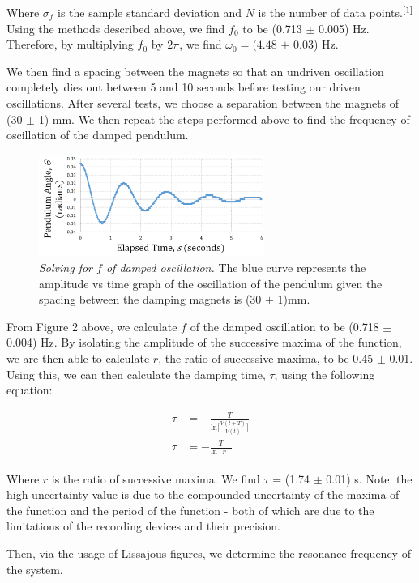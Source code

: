 \documentclass[twoside,twocolumn]{article}
\begin{document}
\noindent Where $\sigma_f$ is the sample standard deviation and $N$ is the number of data points.$\textsuperscript{[1]}$ Using the methods described above, we find $f_0$ to be (0.713 $\pm$ 0.005) Hz. Therefore, by multiplying $f_0$ by $2\pi$, we find $\omega_0 = (4.48$ $\pm$ 0.03) Hz. 


\noindent We then find a spacing between the magnets so that an undriven oscillation completely dies out between 5 and 10 seconds before testing our driven oscillations. After several tests, we choose a separation between the magnets of (30 $\pm$ 1) mm. We then repeat the steps performed above to find the frequency of oscillation of the damped pendulum.

\begin{figure}[!htbp]
    \centering
    \includegraphics[width=2.9in]{DampedFreq.png}
    \caption{\textit{Solving for $f$ of damped oscillation.} The blue curve represents the amplitude vs time graph of the oscillation of the pendulum given the spacing between the damping magnets is (30 $\pm$ 1)mm.}
\end{figure}

\noindent From Figure 2 above, we calculate $f$ of the damped oscillation to be (0.718 $\pm$ 0.004) Hz. By isolating the amplitude of the successive maxima of the function, we are then able to calculate $r$, the ratio of successive maxima, to be 0.45 $\pm$ 0.01. Using this, we can then calculate the damping time, $\tau$, using the following equation:

\footnotesize
\begin{align}
\tau &= -\frac{T}{\text{ln}\Big [\frac{V(t+T)}{V(t)}\Big ]} \\
\tau &= -\frac{T}{\text{ln}[r]}
\end{align}
\normalsize

\noindent Where $r$ is the ratio of successive maxima. We find $\tau$ = (1.74 $\pm$ 0.01) s. Note: the high uncertainty value is due to the compounded uncertainty of the maxima of the function and the period of the function - both of which are due to the limitations of the recording devices and their precision.

\noindent Then, via the usage of Lissajous figures, we determine the resonance frequency of the system. 
\end{document}
